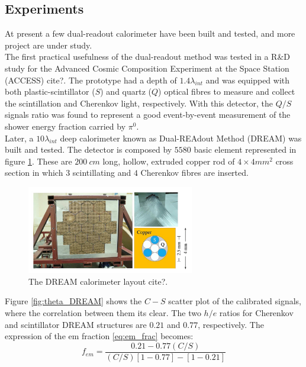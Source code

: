 \subsection{Experiments}
At present a few dual-readout calorimeter have been built and tested, and more project are under study.\\
The first practical usefulness of the dual-readout method was tested in a R&D study for the Advanced Cosmic Composition Experiment at the Space Station (ACCESS) cite?. The prototype had a depth of $1.4\lambda_{int}$ and was equipped with both plastic-scintillator ($S$) and quartz ($Q$) optical fibres to measure and collect the scintillation and Cherenkov light, respectively. With this detector, the $Q/S$ signals ratio was found to represent a good event-by-event measurement of the shower energy fraction carried by $\pi^0$.\\
Later, a $10 \lambda_{int}$ deep calorimeter known as Dual-REAdout Method (DREAM) was built and tested. 
The detector is composed by $5580$ basic element represented in figure \ref{fig:DREAM}. These are $200\ cm$ long, hollow, extruded copper rod of $4\times 4 mm^2$ cross section in which $3$ scintillating and $4$ Cherenkov fibres are inserted.
\begin{figure}
	\centering
	\includegraphics[width=0.65\textwidth]{IMG/Cap2/DREAM.png}
	\caption{The DREAM calorimeter layout cite?.}
	\label{fig:DREAM}
\end{figure}

Figure \ref{fig:theta_DREAM} shows the $C-S$ scatter plot of the calibrated signals, where the correlation between them its clear.
The two $h/e$ ratios for Cherenkov and scintillator DREAM structures are $0.21$ and $0.77$, respectively. The expression of the em fraction \ref{eq:em_frac} becomes:
\begin{equation}
    f_{em} = \frac{0.21-0.77(C/S)}{(C/S)\left[1-0.77\right]-\left[1-0.21\right]}
\end{equation}

